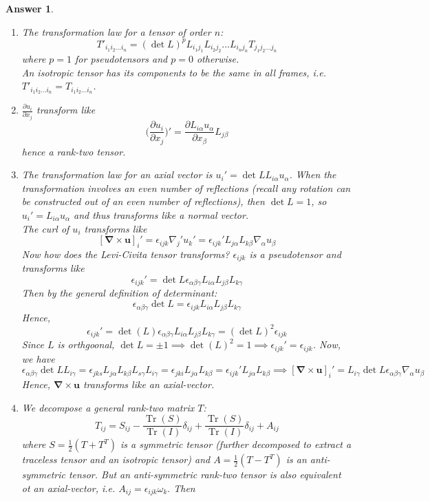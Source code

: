 \documentclass[a4paper]{article}
\DeclareMathOperator{\Tr}{Tr}
\newtheorem{ans}{Answer}[section]
\theoremstyle{new}
\begin{document}
\begin{ans}\leavevmode
\begin{enumerate}[label=(\roman*)]
\item The transformation law for a tensor of order $n$:
$$T'_{i_1i_2...i_n}=(\det L)^pL_{i_1j_1}L_{i_2j_2}...L_{i_nj_n}T_{j_1j_2...j_n}$$
where $p=1$ for pseudotensors and $p=0$ otherwise.\\[5pt]
An isotropic tensor has its components to be the same in all frames, i.e. $T'_{i_1i_2...i_n}=T_{i_1i_2...i_n}$.
\item $\frac{\partial u_i}{\partial x_j}$ transform like $$\bigg(\frac{\partial u_i}{\partial x_j}\bigg)'=\frac{\partial L_{i\alpha}u_\alpha}{\partial x_\beta}L_{j\beta}$$
hence a rank-two tensor.
\item The transformation law for an axial vector is $u_i'=\det L L_{i\alpha}u_\alpha$. When the transformation involves an even number of reflections (recall any rotation can be constructed out of an even number of reflections), then $\det L=1$, so $u_i'=L_{i\alpha}u_\alpha$ and thus transforms like a normal vector.\\[5pt]
The curl of $u_i$ transforms like
$$[\boldsymbol{\nabla}\times\mathbf{u}]_i'=\epsilon_{ijk}\nabla_j'u_k'=\epsilon_{ijk}'L_{j\alpha}L_{k\beta}\nabla_\alpha u_\beta$$
Now how does the Levi-Civita tensor transforms? $\epsilon_{ijk}$ is a pseudotensor and transforms like
$$\epsilon_{ijk}'=\det L\epsilon_{\alpha\beta\gamma}L_{i\alpha}L_{j\beta}L_{k\gamma}$$
Then by the general definition of determinant:
$$\epsilon_{\alpha\beta\gamma}\det L=\epsilon_{ijk}L_{i\alpha}L_{j\beta}L_{k\gamma}$$
Hence,
$$\epsilon_{ijk}'=\det(L)\epsilon_{\alpha\beta\gamma}L_{i\alpha}L_{j\beta}L_{k\gamma}=(\det L)^2\epsilon_{ijk}$$
Since $L$ is orthgoonal, $\det L=\pm1\implies\det(L)^2=1\implies\epsilon_{ijk}'=\epsilon_{ijk}$. Now, we have
$$\epsilon_{\alpha\beta\gamma}\det L L_{i\gamma}=\epsilon_{jks}L_{j\alpha}L_{k\beta}L_{s\gamma}L_{i\gamma}=\epsilon_{jki}L_{j\alpha}L_{k\beta}=\epsilon_{ijk}'L_{j\alpha}L_{k\beta}\implies[\boldsymbol{\nabla}\times\mathbf{u}]_i'=L_{i\gamma}\det L\epsilon_{\alpha\beta\gamma}\nabla_\alpha u_\beta$$
Hence, $\boldsymbol{\nabla}\times\mathbf{u}$ transforms like an axial-vector.
\item We decompose a general rank-two matrix $T$:
$$T_{ij}=S_{ij}-\frac{\Tr(S)}{\Tr(I)}\delta_{ij}+\frac{\Tr(S)}{\Tr(I)}\delta_{ij}+A_{ij}$$
where $S=\frac{1}{2}(T+T^T)$ is a symmetric tensor (further decomposed to extract a traceless tensor and an isotropic tensor) and $A=\frac{1}{2}(T-T^T)$ is an anti-symmetric tensor. But an anti-symmetric rank-two tensor is also equivalent ot an axial-vector, i.e. $A_{ij}=\epsilon_{ijk}\omega_k.$ Then

\end{enumerate}
\end{ans}
\end{document}
